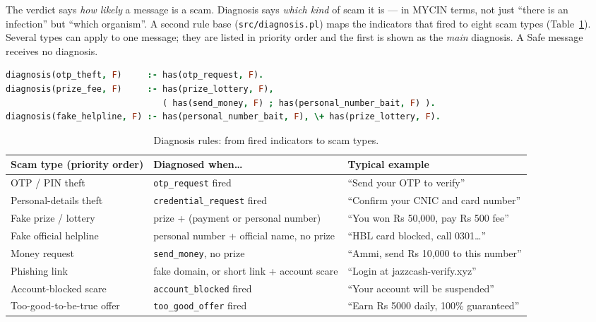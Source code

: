 \documentclass[11pt,a4paper]{article}
\newcommand{\pl}[1]{\texttt{#1}}          %
\begin{document}
The verdict says \emph{how likely} a message is a scam. Diagnosis says \emph{which kind} of scam it
is --- in MYCIN terms, not just ``there is an infection'' but ``which organism''. A second rule base
(\pl{src/diagnosis.pl}) maps the indicators that fired to eight scam types (Table~\ref{tab:diagnosis}).
Several types can apply to one message; they are listed in priority order and the first is shown as
the \emph{main} diagnosis. A Safe message receives no diagnosis.

\begin{lstlisting}[language=Prolog]
diagnosis(otp_theft, F)     :- has(otp_request, F).
diagnosis(prize_fee, F)     :- has(prize_lottery, F),
                               ( has(send_money, F) ; has(personal_number_bait, F) ).
diagnosis(fake_helpline, F) :- has(personal_number_bait, F), \+ has(prize_lottery, F).
\end{lstlisting}

\begin{table}[H]
\centering
\small
\begin{tabularx}{\linewidth}{l X X}
\toprule
\textbf{Scam type (priority order)} & \textbf{Diagnosed when\ldots} & \textbf{Typical example} \\
\midrule
OTP / PIN theft               & \pl{otp\_request} fired & ``Send your OTP to verify'' \\
Personal-details theft        & \pl{credential\_request} fired & ``Confirm your CNIC and card number'' \\
Fake prize / lottery          & prize + (payment or personal number) & ``You won Rs 50,000, pay Rs 500 fee'' \\
Fake official helpline        & personal number + official name, no prize & ``HBL card blocked, call 0301\ldots'' \\
Money request                 & \pl{send\_money}, no prize & ``Ammi, send Rs 10,000 to this number'' \\
Phishing link                 & fake domain, or short link + account scare & ``Login at jazzcash-verify.xyz'' \\
Account-blocked scare         & \pl{account\_blocked} fired & ``Your account will be suspended'' \\
Too-good-to-be-true offer     & \pl{too\_good\_offer} fired & ``Earn Rs 5000 daily, 100\% guaranteed'' \\
\bottomrule
\end{tabularx}
\caption{Diagnosis rules: from fired indicators to scam types.}
\label{tab:diagnosis}
\end{table}
\end{document}
